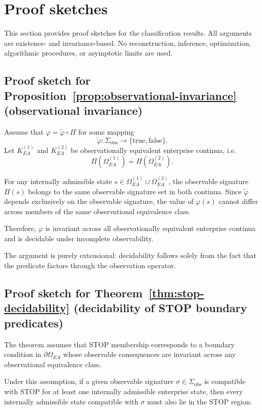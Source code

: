 \section{Proof sketches}
\label{sec:proof_sketches}

This section provides proof sketches for the classification results.
All arguments are existence- and invariance-based. No reconstruction,
inference, optimization, algorithmic procedures, or asymptotic limits
are used.

\subsection{Proof sketch for Proposition~\ref{prop:observational-invariance}
(observational invariance)}

Assume that $\varphi = \tilde{\varphi} \circ \Pi$ for some mapping
\[
\tilde{\varphi} : \Sigma_{\mathrm{obs}} \to \{\text{true},\text{false}\}.
\]
Let $K_{EA}^{(1)}$ and $K_{EA}^{(2)}$ be observationally equivalent
enterprise continua, i.e.
\[
\Pi(\Omega_{EA}^{(1)}) = \Pi(\Omega_{EA}^{(2)}).
\]

For any internally admissible state
$s \in \Omega_{EA}^{(1)} \cup \Omega_{EA}^{(2)}$, the observable
signature $\Pi(s)$ belongs to the same observable signature set in both
continua. Since $\tilde{\varphi}$ depends exclusively on the observable
signature, the value of $\varphi(s)$ cannot differ across members of the
same observational equivalence class.

Therefore, $\varphi$ is invariant across all observationally equivalent
enterprise continua and is decidable under incomplete observability.

The argument is purely extensional: decidability follows solely from the
fact that the predicate factors through the observation operator.

\subsection{Proof sketch for Theorem~\ref{thm:stop-decidability}
(decidability of STOP boundary predicates)}

The theorem assumes that STOP membership corresponds to a boundary
condition in $\partial\Omega_{EA}$ whose observable consequences are
invariant across any observational equivalence class.

Under this assumption, if a given observable signature $\sigma \in
\Sigma_{\mathrm{obs}}$ is compatible with STOP for at least one
internally admissible enterprise state, then every internally
admissible state compatible with $\sigma$ must also lie in the STOP
region.

